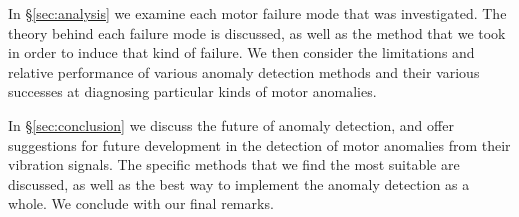 In \S\ref{sec:analysis} we examine each motor failure mode that was investigated. The theory behind each failure mode is discussed, as well as the method that we took in order to induce that kind of failure. We then consider the limitations and relative performance of various anomaly detection methods and their various successes at diagnosing particular kinds of motor anomalies.

In \S\ref{sec:conclusion} we discuss the future of anomaly detection, and offer suggestions for future development in the detection of motor anomalies from their vibration signals. The specific methods that we find the most suitable are discussed, as well as the best way to implement the anomaly detection as a whole. We conclude with our final remarks.